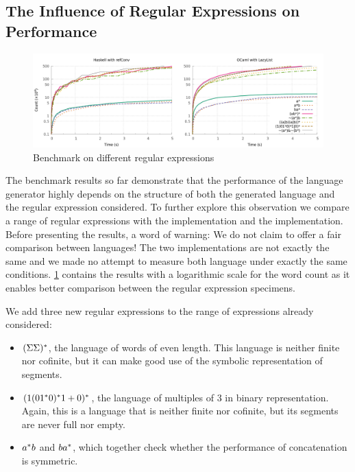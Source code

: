 \subsection{The Influence of Regular Expressions on Performance}
\begin{figure}[!tp]
  \centering
  \includegraphics[width=\linewidth]{measure/langs.png}
  \caption{Benchmark on different regular expressions}
  \label{bench:langs}
\end{figure}

The benchmark results so far demonstrate that the performance of the language
generator highly depends on the structure of both
the generated language and the regular expression considered.
To further explore this observation we compare a range of regular expressions
with the  \haskell implementation and the 
\ocaml implementation.
Before presenting the results, a word of warning:
We do not claim to offer a fair comparison between languages!
The two implementations are not exactly the same and we made no attempt
to measure both language under exactly the same conditions.
%
\cref{bench:langs} contains the results with a
logarithmic scale for the word count as it enables better comparison
between the regular expression specimens.

We add three new regular expressions to the range of expressions already considered:
\begin{itemize}
\item $(\Sigma\Sigma)^*$, the language of words of even
  length. This language is neither finite nor cofinite, but it can make
  good use of the symbolic representation of segments.
\item $(1 (01^*0)^*1 +{0})^*$, the language
  of multiples of 3 in binary representation. Again, this is a language that is neither
  finite nor cofinite, but its segments are never full nor empty.
\item $a^*b$ and $ba^*$, which together check whether
  the performance of {concatenation} is symmetric.
\end{itemize}


